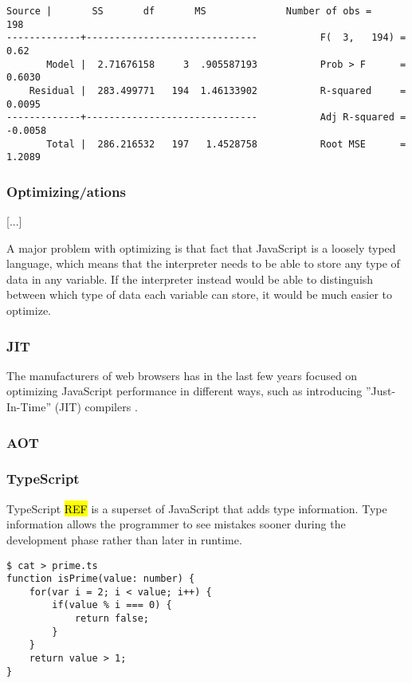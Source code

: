 \begin{lstlisting}[title=Figure 3,numbers=none]
      Source |       SS       df       MS              Number of obs =     198
-------------+------------------------------           F(  3,   194) =    0.62
       Model |  2.71676158     3  .905587193           Prob > F      =  0.6030
    Residual |  283.499771   194  1.46133902           R-squared     =  0.0095
-------------+------------------------------           Adj R-squared = -0.0058
       Total |  286.216532   197   1.4528758           Root MSE      =  1.2089
\end{lstlisting}

\subsubsection{Optimizing/ations}

[...]

A major problem with optimizing is that fact that JavaScript is a loosely typed language, which means that the interpreter needs to be able to store any type of data in any variable. If the interpreter instead would be able to distinguish between which type of data each variable can store, it would be much easier to optimize.

\subsubsection{JIT}

The manufacturers of web browsers has in the last few years focused on optimizing JavaScript performance in different ways, such as introducing ''Just-In-Time'' (JIT) compilers \parencite{HerreraChenLavoieHendren2018}.

\subsubsection{AOT}



\subsubsection{TypeScript}

TypeScript \hl{REF} is a superset of JavaScript that adds type information. Type information allows the programmer to see mistakes sooner during the development phase rather than later in runtime.

\begin{verbatim}
$ cat > prime.ts
function isPrime(value: number) {
    for(var i = 2; i < value; i++) {
        if(value % i === 0) {
            return false;
        }
    }
    return value > 1;
}
\end{verbatim}

